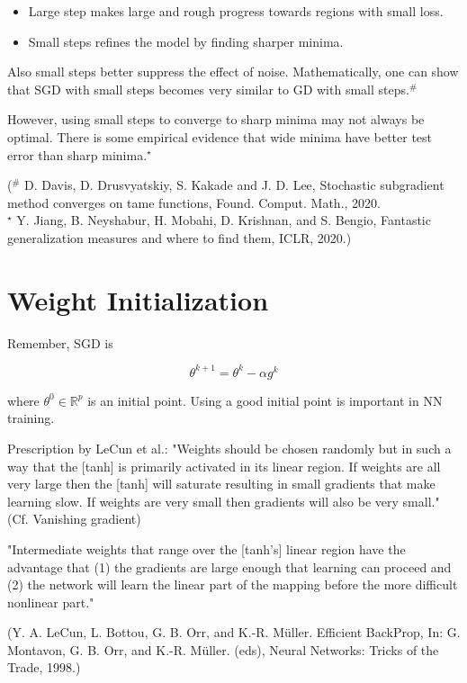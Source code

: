 \documentclass{report}
\begin{document}
\begin{concept}
    \begin{itemize}
        \item Large step makes large and rough progress towards regions with small loss.
        \item Small steps refines the model by finding sharper minima.
    \end{itemize}

    Also small steps better suppress the effect of noise. Mathematically, one can show that SGD with small steps becomes very similar to GD with small steps.${ }^{\#}$

    However, using small steps to converge to sharp minima may not always be optimal. There is some empirical evidence that wide minima have better test error than sharp minima.${ }^{\star}$

    (${ }^{\#}$ D. Davis, D. Drusvyatskiy, S. Kakade and J. D. Lee, Stochastic subgradient method converges on tame functions, Found. Comput. Math., 2020.\\
    ${ }^{\star}$ Y. Jiang, B. Neyshabur, H. Mobahi, D. Krishnan, and S. Bengio, Fantastic generalization measures and where to find them, ICLR, 2020.)
\end{concept}

\section{Weight Initialization}

\begin{concept}
    Remember, SGD is

    $$
    \theta^{k+1}=\theta^{k}-\alpha g^{k}
    $$

    where $\theta^{0} \in \mathbb{R}^{p}$ is an initial point. Using a good initial point is important in NN training.

    Prescription by LeCun et al.: "Weights should be chosen randomly but in such a way that the [tanh] is primarily activated in its linear region. If weights are all very large then the [tanh] will saturate resulting in small gradients that make learning slow. If weights are very small then gradients will also be very small." (Cf. Vanishing gradient)

    "Intermediate weights that range over the [tanh's] linear region have the advantage that (1) the gradients are large enough that learning can proceed and (2) the network will learn the linear part of the mapping before the more difficult nonlinear part."

    (Y. A. LeCun, L. Bottou, G. B. Orr, and K.-R. Müller. Efficient BackProp, In: G. Montavon, G. B. Orr, and K.-R. Müller. (eds), Neural Networks: Tricks of the Trade, 1998.)
\end{concept}
\end{document}
